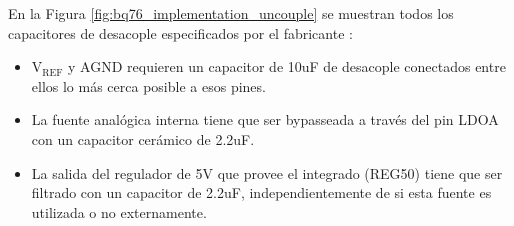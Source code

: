 \documentclass[10pt, a4paper]{report}
\begin{document}
En la Figura \ref{fig:bq76_implementation_uncouple} se muestran todos los capacitores de desacople
especificados por el fabricante \cite{BQ76PL536A}:
\begin{itemize}
    \item $\mathrm{V_{REF}}$ y AGND requieren un capacitor de 10uF de
        desacople conectados entre ellos lo m\'as cerca posible a esos pines.
    \item La fuente anal\'ogica interna tiene que ser bypasseada a trav\'es del
        pin LDOA con un capacitor cer\'amico de 2.2uF.
    \item La salida del regulador de 5V que provee el integrado (REG50) tiene 
        que ser filtrado con un capacitor de 2.2uF, independientemente de si 
        esta fuente es utilizada o no externamente.
\end{itemize}
\end{document}
